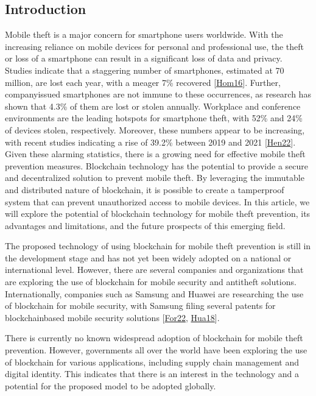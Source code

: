 \documentclass[letterpaper,10pt,english]{jupyterBook}
\begin{document}
\subsection{Introduction}
\label{\detokenize{MTP/mtp:introduction}}
\sphinxAtStartPar
Mobile theft is a major concern for smartphone users worldwide. With the increasing reliance on mobile devices for personal and professional use, the theft or loss of a smartphone can result in a significant loss of data and privacy. Studies indicate that a staggering number of smartphones, estimated at 70 million, are lost each year, with a meager 7\% recovered {[}\hyperlink{cite.MTP/mtp:id15}{Hom16}{]}. Further, company\sphinxhyphen{}issued smartphones are not immune to these occurrences, as research has shown that 4.3\% of them are lost or stolen annually. Workplace and conference environments are the leading hotspots for smartphone theft, with 52\% and 24\% of devices stolen, respectively. Moreover, these numbers appear to be increasing, with recent studies indicating a rise of 39.2\% between 2019 and 2021 {[}\hyperlink{cite.MTP/mtp:id16}{Hen22}{]}. Given these alarming statistics, there is a growing need for effective mobile theft prevention measures. Blockchain technology has the potential to provide a secure and decentralized solution to prevent mobile theft. By leveraging the immutable and distributed nature of blockchain, it is possible to create a tamper\sphinxhyphen{}proof system that can prevent unauthorized access to mobile devices. In this article, we will explore the potential of blockchain technology for mobile theft prevention, its advantages and limitations, and the future prospects of this emerging field.

\sphinxAtStartPar
The proposed technology of using blockchain for mobile theft prevention is still in the development stage and has not yet been widely adopted on a national or international level. However, there are several companies and organizations that are exploring the use of blockchain for mobile security and anti\sphinxhyphen{}theft solutions. Internationally, companies such as Samsung and Huawei are researching the use of blockchain for mobile security, with Samsung filing several patents for blockchain\sphinxhyphen{}based mobile security solutions {[}\hyperlink{cite.MTP/mtp:id17}{For22}, \hyperlink{cite.MTP/mtp:id18}{Hua18}{]}.

\sphinxAtStartPar
There is currently no known widespread adoption of blockchain for mobile theft prevention. However, governments all over the world have been exploring the use of blockchain for various applications, including supply chain management and digital identity. This indicates that there is an interest in the technology and a potential for the proposed model to be adopted globally.
\end{document}
